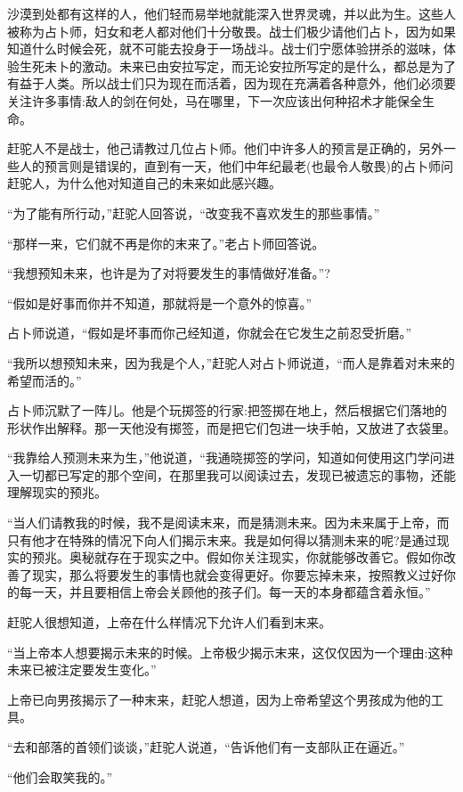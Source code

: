 \documentclass[twoside,openany]{book}
\begin{document}
沙漠到处都有这样的人，他们轻而易举地就能深入世界灵魂，并以此为生。这些人被称为占卜师，妇女和老人都对他们十分敬畏。战士们极少请他们占卜，因为如果知道什么时候会死，就不可能去投身于一场战斗。战士们宁愿体验拼杀的滋味，体验生死未卜的激动。未来已由安拉写定，而无论安拉所写定的是什么，都总是为了有益于人类。所以战士们只为现在而活着，因为现在充满着各种意外，他们必须要关注许多事情:敌人的剑在何处，马在哪里，下一次应该出何种招术才能保全生命。

赶驼人不是战士，他己请教过几位占卜师。他们中许多人的预言是正确的，另外一些人的预言则是错误的，直到有一天，他们中年纪最老(也最令人敬畏)的占卜师问赶驼人，为什么他对知道自己的未来如此感兴趣。

“为了能有所行动，”赶驼人回答说，“改变我不喜欢发生的那些事情。”

“那样一来，它们就不再是你的末来了。”老占卜师回答说。

“我想预知未来，也许是为了对将要发生的事情做好准备。”?

“假如是好事而你并不知道，那就将是一个意外的惊喜。”

占卜师说道，“假如是坏事而你己经知道，你就会在它发生之前忍受折磨。”

“我所以想预知未来，因为我是个人，”赶驼人对占卜师说道，“而人是靠着对未来的希望而活的。”

占卜师沉默了一阵儿。他是个玩掷签的行家:把签掷在地上，然后根据它们落地的形状作出解释。那一天他没有掷签，而是把它们包进一块手帕，又放进了衣袋里。

“我靠给人预测未来为生，”他说道，“我通晓掷签的学问，知道如何使用这门学问进入一切都已写定的那个空间，在那里我可以阅读过去，发现已被遗忘的事物，还能理解现实的预兆。

“当人们请教我的时候，我不是阅读末来，而是猜测未来。因为未来属于上帝，而只有他才在特殊的情况下向人们揭示末来。我是如何得以猜测未来的呢?是通过现实的预兆。奥秘就存在于现实之中。假如你关注现实，你就能够改善它。假如你改善了现实，那么将要发生的事情也就会变得更好。你要忘掉未来，按照教义过好你的每一天，并且要相信上帝会关顾他的孩子们。每一天的本身都蕴含着永恒。”

赶驼人很想知道，上帝在什么样情况下允许人们看到末来。

“当上帝本人想要揭示未来的时候。上帝极少揭示末来，这仅仅因为一个理由:这种未来已被注定要发生变化。”

上帝已向男孩揭示了一种末来，赶驼人想道，因为上帝希望这个男孩成为他的工具。

“去和部落的首领们谈谈，”赶驼人说道，“告诉他们有一支部队正在逼近。”

“他们会取笑我的。”
\end{document}
